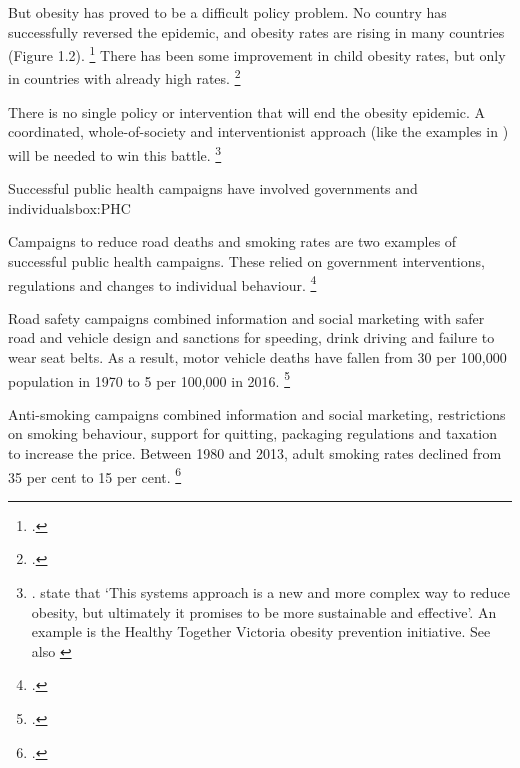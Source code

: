 \documentclass[embargoed]{grattan}
\begin{document}
\begin{table}
\caption{Commonwealth government obesity/preventative health reports and committees}\label{tbl:Health-campaigns}



\end{table}


But obesity has proved to be a difficult policy problem.
No country has successfully reversed the epidemic, and obesity rates are rising in many countries (Figure 1.2).%
\footcites{Australia2015NoTimeWeight}{Roberto2015Patchyprogressobesity}{Swinburn2004Dietnutritionprevention} There has been some improvement in child obesity rates, but only in countries with already high rates.%
\footcite{Roberto2015Patchyprogressobesity}

There is no single policy or intervention that will end the obesity epidemic.
A coordinated, whole-of-society and interventionist approach (like the examples in ) will be needed to win this battle.%
\footnote{\textcites{Sassi2016Taxingsugar}{Karnani2016ObesityCrisisas}{Huang2009systemsorientedmultilevel}. \textcite{Swinburn2013Progressobesityprevention} state that `This systems approach is a new and more complex way to reduce obesity, but ultimately it promises to be more sustainable and effective'.
An example is the Healthy Together Victoria obesity prevention initiative.
See also \textcites{Mckinsey2014overcomingobesity}{Health2016Insufficientphysicalactivity}}

\begin{smallbox}{Successful public health campaigns have involved governments and individuals}{box:PHC}

Campaigns to reduce road deaths and smoking rates are two examples of successful public health campaigns.
These relied on government interventions, regulations and changes to individual behaviour.%
\footcite{MacKay2011Legislativesolutionsunhealthy}

Road safety campaigns combined information and social marketing with safer road and vehicle design and sanctions for speeding, drink driving and failure to wear seat belts.
As a result, motor vehicle deaths have fallen from 30 per 100,000 population in 1970 to 5 per 100,000 in 2016.%
\footcites{BITRE2010RoaddeathsAustralia}{BITRE2010RoaddeathsAustralia}

Anti-smoking campaigns combined information and social marketing, restrictions on smoking behaviour, support for quitting, packaging regulations and taxation to increase the price.
Between 1980 and 2013, adult smoking rates declined from 35 per cent to 15 per cent.%
\footcite{Scollo2016TobaccoAustraliaFacts}
\end{smallbox}
\end{document}

